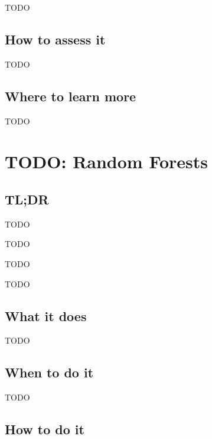 \documentclass[
]{book}
\providecommand{\tightlist}{%
  \setlength{\itemsep}{0pt}\setlength{\parskip}{0pt}}
\begin{document}
TODO

\hypertarget{how-to-assess-it-16}{%
\section{How to assess it}\label{how-to-assess-it-16}}

TODO

\hypertarget{where-to-learn-more-16}{%
\section{Where to learn more}\label{where-to-learn-more-16}}

TODO

\hypertarget{random-forests}{%
\chapter{TODO: Random Forests}\label{random-forests}}

\hypertarget{tldr-17}{%
\section{TL;DR}\label{tldr-17}}

\begin{description}
\tightlist
\item[What it does]
TODO
\item[When to do it]
TODO
\item[How to do it]
TODO
\item[How to assess it]
TODO
\end{description}

\hypertarget{what-it-does-17}{%
\section{What it does}\label{what-it-does-17}}

TODO

\hypertarget{when-to-do-it-17}{%
\section{When to do it}\label{when-to-do-it-17}}

TODO

\hypertarget{how-to-do-it-17}{%
\section{How to do it}\label{how-to-do-it-17}}
\end{document}
